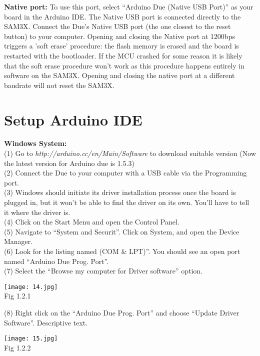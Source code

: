 \documentclass[12pt]{report}
\begin{document}
\begin{flushleft}
\textbf{Native port:}
\textup{To use this port, select ``Arduino Due (Native USB Port)'' as your board in the Arduino IDE. The Native USB port is connected directly to the SAM3X. Connect the Due's Native USB port (the one closest to the reset button) to your computer. Opening and closing the Native port at 1200bps triggers a 'soft erase' procedure: the flash memory is erased and the board is restarted with the bootloader. If the MCU crashed for some reason it is likely that the soft erase procedure won't work as this procedure happens entirely in software on the SAM3X. Opening and closing the native port at a different baudrate will not reset the SAM3X.}
\end{flushleft}
\section{\large Setup Arduino IDE}
\textbf{Windows System:\\}
\textup{(1) Go to }
\textsl{http://arduino.cc/en/Main/Software}
\textup{to download suitable version (Now the latest version for Arduino due is 1.5.3)\\}
\textup{(2) Connect the Due to your computer with a USB cable via the Programming port.\\}
\textup{(3) Windows should initiate its driver installation process once the board is plugged in, but it won't be able to find the driver on its own. You'll have to tell it where the driver is.\\}
\textup{(4) Click on the Start Menu and open the Control Panel.\\}
\textup{(5) Navigate to ``System and Securit''. Click on System, and open the Device Manager.\\}
\textup{(6) Look for the listing named (COM \& LPT)”. You should see an open port named ``Arduino Due Prog. Port''.\\}
\textup{(7) Select the “Browse my computer for Driver software” option.}
\begin{center}
\texttt{[image: 14.jpg]}\\
\textup{\footnotesize Fig 1.2.1}
\end{center}
\textup{(8) Right click on the ``Arduino Due Prog. Port'' and choose ``Update Driver Software''. Descriptive text.}
\begin{center}
\texttt{[image: 15.jpg]}\\
\textup{\footnotesize Fig 1.2.2}
\end{center}
\end{document}
